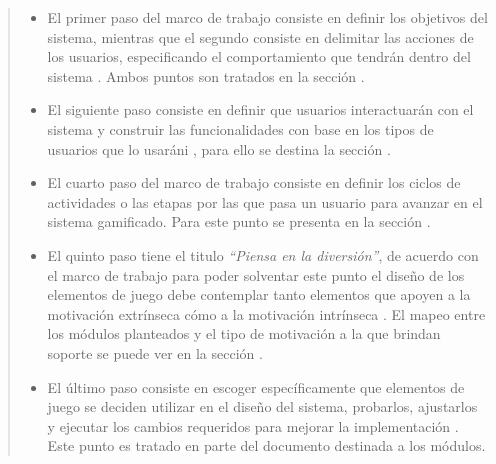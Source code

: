     \begin{quote}
    \begin{itemize}
    \item El primer paso del marco de trabajo consiste en definir los objetivos del
          sistema, mientras que el segundo consiste en delimitar las acciones de los
          usuarios, especificando el comportamiento que tendrán dentro del sistema 
          \cite[p. 61, 63]{ForTheWin}. Ambos puntos son tratados en la sección .\\

    \item El siguiente paso consiste en definir que usuarios interactuarán con el sistema
          y construir las funcionalidades con base en los tipos de usuarios que lo
          usaráni \cite[p. 64]{ForTheWin}, para ello se destina la sección .\\

    \item El cuarto paso del marco de trabajo consiste en definir los ciclos de actividades
          o las etapas por las que pasa un usuario para avanzar en el sistema gamificado.
          \cite[p. 66]{ForTheWin}
          Para este punto se presenta en la sección .\\

    \item El quinto paso tiene el titulo {\it``Piensa en la diversión''}, de acuerdo con el
          marco de trabajo para poder solventar este punto el diseño de los elementos de
          juego debe contemplar tanto elementos que apoyen a la motivación extrínseca cómo
          a la motivación intrínseca \cite[p. 68]{ForTheWin}. El mapeo entre los módulos
          planteados y el tipo de motivación a la que brindan soporte se puede ver en la
          sección .\\

    \item El último paso consiste en escoger específicamente que elementos de juego se
          deciden utilizar en el diseño del sistema, probarlos, ajustarlos y ejecutar
          los cambios requeridos para mejorar la implementación \cite[p. 69]{ForTheWin}.
          Este punto es tratado en parte del documento destinada a los módulos.
    \end{itemize}
    \end{quote}
